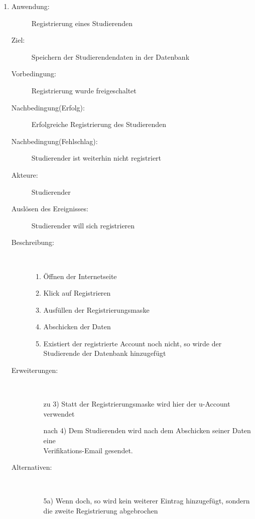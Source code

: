 \documentclass[parskip=full]{scrartcl}
\newcommand{\swtLabel}[1]{\textbf{\textbackslash #1\arabic*0\textbackslash}}
\begin{document}
\begin{enumerate}[label=\swtLabel{S}]
	\item
    \begin{description}
  	\item[Anwendung:] Registrierung eines Studierenden
  	\item[Ziel:] Speichern der Studierendendaten in der Datenbank
  	\item[Vorbedingung:] Registrierung wurde freigeschaltet
  	\item[Nachbedingung(Erfolg):] Erfolgreiche Registrierung des Studierenden
  	\item[Nachbedingung(Fehlschlag):] Studierender ist weiterhin nicht
  	registriert
  	\item[Akteure:] Studierender
  	\item[Auslösen des Ereignisses:] Studierender will sich registrieren
  	\item[Beschreibung:]~
  	\begin{enumerate}
  	  \item Öffnen der Internetseite
      \item Klick auf Registrieren
      \item Ausfüllen der Registrierungsmaske
      \item Abschicken der Daten
      \item Existiert der registrierte Account noch nicht, so wirde der Studierende
      der Datenbank hinzugefügt
  	\end{enumerate}
  	\item[Erweiterungen:]~
  	\begin{enumerate}
  	  \item[zu 3)] Statt der Registrierungsmaske wird hier der u-Account
  	  verwendet
  	  \item[nach 4)] Dem Studierenden wird nach dem Abschicken seiner Daten eine
  	  \\
  	  Verifikations-Email gesendet.
  	 \end{enumerate} 
  	\item[Alternativen:]~
  	\begin{enumerate}
  	  \item[5a)] Wenn doch, so wird kein weiterer Eintrag hinzugefügt, sondern
  	  die zweite Registrierung abgebrochen
  	\end{enumerate} 
  \end{description}
%   
  

\end{enumerate}
\end{document}
